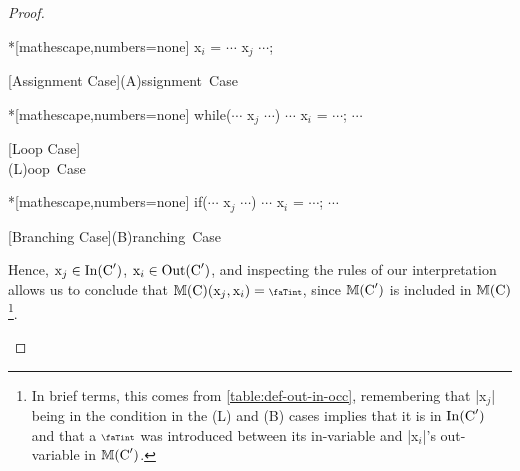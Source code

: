 \begin{proof}
\begin{description}
\begin{minipage}[t]{.3\linewidth}
\begin{whilelisting}*[mathescape,numbers=none]
x$_i$ = $\cdots$ x$_j$ $\cdots$;
\end{whilelisting}
[Assignment Case]{\mbox{(A)ssignment Case}}
\label{listing-A}
\end{minipage}\hfill%
\begin{minipage}[t]{.3\linewidth}
\begin{whilelisting}*[mathescape,numbers=none]
while($\cdots$ x$_j$ $\cdots$){
  $\cdots$
  x$_i$ = $\cdots$;
  $\cdots$
}
\end{whilelisting}
[Loop Case]{\\\mbox{(L)oop Case}}
\label{listing-L}
\end{minipage}\hfill%
\begin{minipage}[t]{.3\linewidth}
\begin{whilelisting}*[mathescape,numbers=none]
if($\cdots$ x$_j$ $\cdots$){
  $\cdots$
  x$_i$ = $\cdots$;
  $\cdots$
}
\end{whilelisting}
[Branching Case]{\mbox{(B)ranching Case}}
\label{listing-I}
\end{minipage}

Hence, \ensuremath{\prc|x$_j$| \in
\In(\prc|C|')}, \ensuremath{\prc|x$_i$| \in
\Out(\prc|C|')}, and inspecting the rules of our
interpretation allows us to conclude that
\ensuremath{\sfm{\prc|C|}(\prc|x$_j$|,\prc|x$_i$|)= \vi},
since \(\sfm{\prc|C|'}\) is included in
\(\sfm{\prc|C|}\)\footnote{In brief terms, this comes from
\autoref{table:def-out-in-occ}, remembering that \prc|x$_j$| being
in the condition in the (L) and (B) cases implies that it is in
\(\In(\prc|C|')\) and that a \(\vi\) was
introduced between its in-variable and \prc|x$_i$|'s out-variable
in \(\sfm{\prc|C|'}\).}.


\end{description}
\end{proof}
